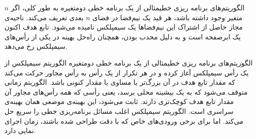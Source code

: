 \begin{itemframe-s}{الگوریتم‌های برنامه ریزی خطی}{مثالی از یک برنامه خطی دو‌متغیره}
\itm
به طور کلی، اگر $n$ متغیر وجود داشته باشد، هر قید یک نیم‌فضا در فضای $n$ بعدی تعریف می‌کند.
\itm
ناحیه‌ی مجاز حاصل از اشتراک این نیم‌فضاها یک سیمپلکس
 نامیده می‌شود.
\itm
تابع هدف اکنون یک ابرصفحه است و به دلیل محدب بودن، همچنان راه‌حل بهینه در یکی از رأس‌های سیمپلکس رخ می‌دهد.
\end{itemframe-s}


\begin{itemframe-s}{الگوریتم‌های برنامه ریزی خطی}{مثالی از یک برنامه خطی دو‌متغیره}
\itm
الگوریتم سیمپلکس از یک رأس سیمپلکس آغاز کرده و در هر تکرار از یک رأس به رأس مجاور حرکت می‌کند که مقدار تابع هدف در آن بزرگ‌تر یا مساوی با مقدار کنونی باشد.
\itm
الگوریتم زمانی متوقف می‌شود که به یک بیشینه محلی برسد، یعنی رأسی که همه رأس‌های مجاور آن مقدار تابع هدف کوچک‌تری دارند.
ثابت می‌شود، این بهینه‌ی موضعی همان بهینه‌ی سراسری است.
\itm
الگوریتم سیمپلکس اغلب مسائل برنامه‌ریزی خطی را سریع حل می‌کند.
اما برای برخی ورودی‌های خاص که با دقت طراحی شده‌ باشند، زمان اجرای نمایی دارد.
\end{itemframe-s}